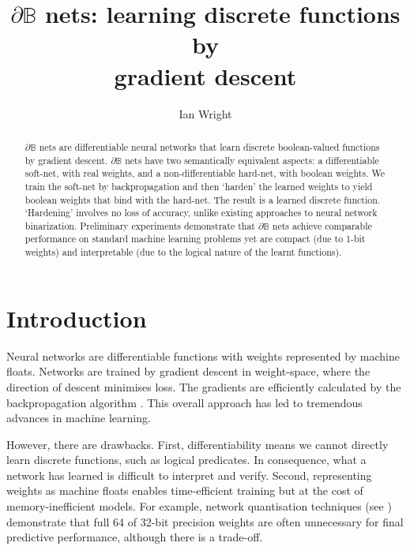 \documentclass{article} %
\title{$\partial\mathbb{B}$ nets: learning discrete functions by\\gradient descent}
\author{Ian Wright}
\begin{document}
\maketitle

\begin{abstract}
	$\partial\mathbb{B}$ nets are differentiable neural networks that learn discrete boolean-valued functions by gradient descent. $\partial\mathbb{B}$ nets have two semantically equivalent aspects: a differentiable soft-net, with real weights, and a non-differentiable hard-net, with boolean weights. We train the soft-net by backpropagation and then `harden' the learned weights to yield boolean weights that bind with the hard-net. The result is a learned discrete function. `Hardening' involves no loss of accuracy, unlike existing approaches to neural network binarization. Preliminary experiments demonstrate that $\partial\mathbb{B}$ nets achieve comparable performance on standard machine learning problems yet are compact (due to 1-bit weights) and interpretable (due to the logical nature of the learnt functions).
\end{abstract}

\section{Introduction}

Neural networks are differentiable functions with weights represented by machine floats. Networks are trained by gradient descent in weight-space, where the direction of descent minimises loss. The gradients are efficiently calculated by the backpropagation algorithm \citep{rumelhart1986learning}. This overall approach has led to tremendous advances in machine learning.

However, there are drawbacks. First, differentiability means we cannot directly learn discrete functions, such as logical predicates. In consequence, what a network has learned is difficult to interpret and verify. Second, representing weights as machine floats enables time-efficient training but at the cost of memory-inefficient models. For example, network quantisation techniques (see \cite{QIN2020107281}) demonstrate that full 64 of 32-bit precision weights are often unnecessary for final predictive performance, although there is a trade-off.
\end{document}
